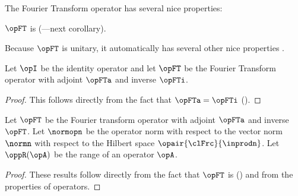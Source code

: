 The Fourier Transform operator has several nice properties:
\begin{liste}
  \item $\opFT$ is 
    (---next corollary).
  \item Because $\opFT$ is unitary, it automatically has several other nice
        properties %
        .
\end{liste}

\begin{corollary}
\label{cor:ft_unitary}
Let $\opI$ be the identity operator
and let $\opFT$ be the Fourier Transform operator with
adjoint $\opFTa$ and inverse $\opFTi$.
\end{corollary}
\begin{proof}
  This follows directly from the fact that $\opFTa=\opFTi$ ().
\end{proof}

\begin{theorem}
\label{thm:ft_prop}
\label{thm:planform}
Let $\opFT$ be the Fourier transform operator with adjoint $\opFTa$ and inverse $\opFT$.
Let $\normopn$ be the operator norm with respect to the vector norm $\normn$ with respect to the
Hilbert space $\opair{\clFrc}{\inprodn}$.
Let $\oppR(\opA)$ be the range of an operator $\opA$.
\end{theorem}
\begin{proof}
These results follow directly from the fact that $\opFT$
is  () and from
the properties of  operators.
\end{proof}

